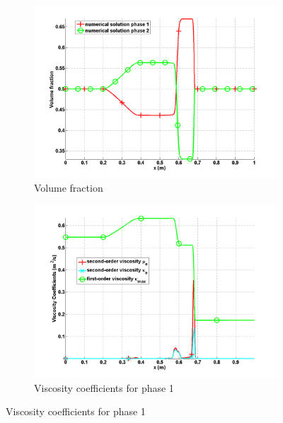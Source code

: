 \documentclass{anstrans}
\begin{document}
\begin{figure}[H]
        \begin{subfigure}[b]{0.495\textwidth}
                \centering
                \includegraphics[width=\textwidth]{plots/relaxation_two_phases_volume_fraction.png}
                \caption{Volume fraction}
                \label{fig:volume_fraction}
        \end{subfigure}
        
        \begin{subfigure}[b]{0.495\textwidth}
                \centering
                \includegraphics[width=\textwidth]{plots/relaxation_two_phases_liquid_viscosity_kappa_mu.png}
                \caption{Viscosity coefficients for phase 1}
                \label{fig:viscosity_coeff_liq}
        \end{subfigure}        
				

\end{figure}
\end{document}

